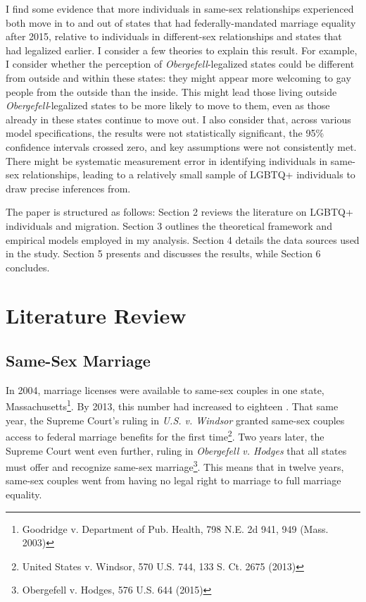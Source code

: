 \documentclass[12pt,letterpaper]{article}
\begin{document}
I find some evidence that more individuals in same-sex relationships experienced both move in to and out of states that had federally-mandated marriage equality after 2015, relative to individuals in different-sex relationships and states that had legalized earlier. I consider a few theories to explain this result. For example, I consider whether the perception of \textit{Obergefell}-legalized states could be different from outside and within these states: they might appear more welcoming to gay people from the outside than the inside. This might lead those living outside \textit{Obergefell}-legalized states to be more likely to move to them, even as those already in these states continue to move out. I also consider that, across various model specifications, the results were not statistically significant, the 95\% confidence intervals crossed zero, and key assumptions were not consistently met. There might be systematic measurement error in identifying individuals in same-sex relationships, leading to a relatively small sample of LGBTQ+ individuals to draw precise inferences from.

The paper is structured as follows: Section 2 reviews the literature on LGBTQ+ individuals and migration. Section 3 outlines the theoretical framework and empirical models employed in my analysis. Section 4 details the data sources used in the study. Section 5 presents and discusses the results, while Section 6 concludes.

\section{Literature Review}
\subsection{Same-Sex Marriage}
In 2004, marriage licenses were available to same-sex couples in one state, Massachusetts\footnote{Goodridge v. Department of Pub. Health, 798 N.E. 2d 941, 949 (Mass. 2003)}. By 2013, this number had increased to eighteen \citep{27}. That same year, the Supreme Court's ruling in \textit{U.S. v. Windsor} granted same-sex couples access to federal marriage benefits for the first time\footnote{United States v. Windsor, 570 U.S. 744, 133 S. Ct. 2675 (2013)}. Two years later, the Supreme Court went even further, ruling in \textit{Obergefell v. Hodges} that all states must offer and recognize same-sex marriage\footnote{Obergefell v. Hodges, 576 U.S. 644 (2015)}. This means that in twelve years, same-sex couples went from having no legal right to marriage to full marriage equality. 
\end{document}
